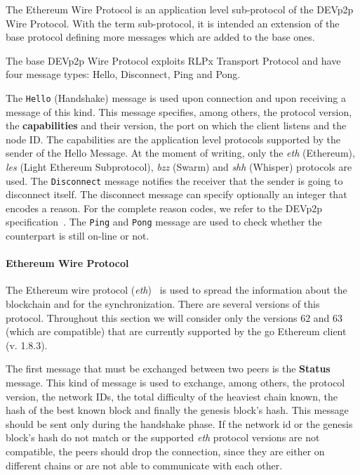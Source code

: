 The Ethereum Wire Protocol is an application level sub-protocol of the DEVp2p
Wire Protocol. With the term sub-protocol, it is intended an extension of the
base protocol defining more messages which are added to the base ones.

The base DEVp2p Wire Protocol exploits RLPx Transport Protocol and have four
message types: Hello, Disconnect, Ping and Pong.

The \verb+Hello+ (Handshake) message is used upon connection and upon receiving
a message of this kind. This message specifies, among others, the protocol
version, the \textbf{capabilities} and their version, the port on which the
client listens and the node ID. The capabilities are the application level
protocols supported by the sender of the Hello Message. At the moment of
writing, only the \emph{eth} (Ethereum), \emph{les} (Light Ethereum
Subprotocol), \emph{bzz} (Swarm) and \emph{shh} (Whisper) protocols are used.
The \verb+Disconnect+ message notifies the receiver that the sender is going to
disconnect itself. The disconnect message can specify optionally an integer that
encodes a reason. For the complete reason codes, we refer to the DEVp2p
specification~\cite{devp2pwire}. The \verb+Ping+ and \verb+Pong+ message are
used to check whether the counterpart is still on-line or not.


\paragraph{Ethereum Wire Protocol}
The Ethereum wire protocol (\emph{eth})~\cite{bib:ethereumwireprotocol} is used
to spread the information about the blockchain and for the synchronization.
There are several versions of this protocol. Throughout this section we will
consider only the versions $62$ and $63$ (which are compatible) that are
currently supported by the go Ethereum client (v. 1.8.3).

The first message that must be exchanged between two peers
is the \textbf{Status} message. This kind of message is used to exchange,
among others, the protocol version, the network IDs, the total difficulty of the
heaviest chain known, the hash of the best known block and
finally the genesis block's hash. This message should be sent only during
the handshake phase.
If the network id or the genesis block's hash do not match or the supported
\emph{eth} protocol versions are not compatible, the peers should drop
the connection, since they are either on different chains or are not able to
communicate with each other.




